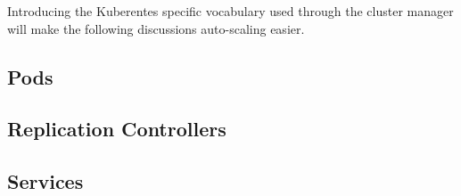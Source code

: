 Introducing the Kuberentes specific vocabulary used through the cluster manager
will make the following discussions auto-scaling easier.

\subsection{Pods}



\subsection{Replication Controllers}



\subsection{Services}


